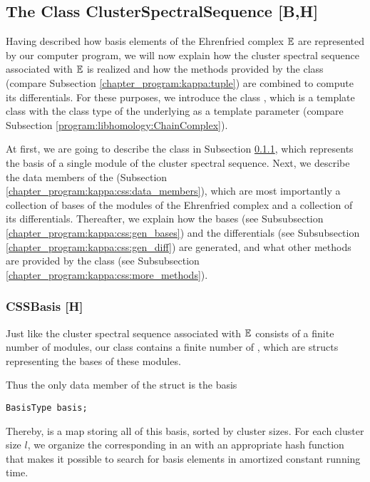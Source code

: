\subsection{The Class ClusterSpectralSequence [B,H]}
\label{chapter_program:kappa:css}

Having described how basis elements of the Ehrenfried complex $\mathbb E$ are represented by our computer program, 
we will now explain how the cluster spectral sequence associated with $\mathbb E$ is realized 
and how the methods provided by the class  (compare Subsection \ref{chapter_program:kappa:tuple}) are combined 
to compute its differentials.
For these purposes, we introduce the class , 
which is a template class with the class type of the underlying  as a template parameter
(compare Subsection \ref{program:libhomology:ChainComplex}).

At first, we are going to describe the class  in Subsection \ref{chapter_program:kappa:css:css_basis}, 
which represents the basis of a single module of the cluster spectral sequence. 
Next, we describe the data members of the  (Subsection \ref{chapter_program:kappa:css:data_members}),
which are most importantly a collection of bases of the modules of the Ehrenfried complex and 
a collection of its differentials.
Thereafter, we explain how the bases (see Subsubsection \ref{chapter_program:kappa:css:gen_bases}) and 
the differentials (see Subsubsection \ref{chapter_program:kappa:css:gen_diff}) are generated, 
and what other methods are provided by the class  (see Subsubsection \ref{chapter_program:kappa:css:more_methods}). 

\subsubsection{CSSBasis [H]}
\label{chapter_program:kappa:css:css_basis}

Just like the cluster spectral sequence associated with $\mathbb E$ consists of a finite number of modules, 
our class  contains a finite number of , 
which are structs representing the bases of these modules.

Thus the only data member of the struct  is the basis
\begin{lstlisting}
BasisType basis;
\end{lstlisting}
Thereby,  is a map storing all  of this basis, sorted by cluster sizes.
For each cluster size $l$, we organize the corresponding  in an 
with an appropriate hash function that makes it possible to search for basis elements in amortized constant running time.

